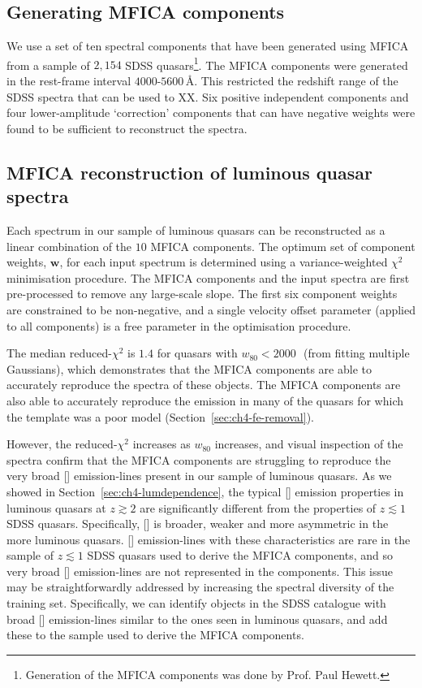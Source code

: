 \subsection{Generating MFICA components}

We use a set of ten spectral components that have been generated using MFICA from a sample of $2,154$ SDSS quasars\footnote{Generation of the MFICA components was done by Prof. Paul Hewett.}.
The MFICA components were generated in the rest-frame interval $4000$-$5600$\,\AA.
This restricted the redshift range of the SDSS spectra that can be used to XX.
Six positive independent components and four lower-amplitude `correction' components that can have negative weights were found to be sufficient to reconstruct the spectra. 

\subsection{MFICA reconstruction of luminous quasar spectra}

Each spectrum in our sample of luminous quasars can be reconstructed as a linear combination of the $10$ MFICA components. 
The optimum set of component weights, $\mathbf{w}$, for each input spectrum is determined using a variance-weighted $\chi^2$ minimisation procedure. 
The MFICA components and the input spectra are first pre-processed to remove any large-scale slope.  
The first six component weights are constrained to be non-negative, and a single velocity offset parameter (applied to all components) is a free parameter in the optimisation procedure. 

The median reduced-$\chi^2$ is $1.4$ for quasars with $w_{80} < 2000$\,\kms\, (from fitting multiple Gaussians), which demonstrates that the MFICA components are able to accurately reproduce the spectra of these objects. 
The MFICA components are also able to accurately reproduce the  emission in many of the quasars for which the \citet{boroson92} template was a poor model (Section~\ref{sec:ch4-fe-removal}). 

However, the reduced-$\chi^2$ increases as $w_{80}$ increases, and visual inspection of the spectra confirm that the MFICA components are struggling to reproduce the very broad [] emission-lines present in our sample of luminous quasars. 
As we showed in Section~\ref{sec:ch4-lumdependence}, the typical [] emission properties in luminous quasars at $z \gtrsim 2$ are significantly different from the properties of $z \lesssim 1$ SDSS quasars. 
Specifically, [] is broader, weaker and more asymmetric in the more luminous quasars.  
[] emission-lines with these characteristics are rare in the sample of $z \lesssim 1$ SDSS quasars used to derive the MFICA components, and so very broad [] emission-lines are not represented in the components. 
This issue may be straightforwardly addressed by increasing the spectral diversity of the training set. 
Specifically, we can identify objects in the SDSS catalogue with broad [] emission-lines similar to the ones seen in luminous quasars, and add these to the sample used to derive the MFICA components. 

